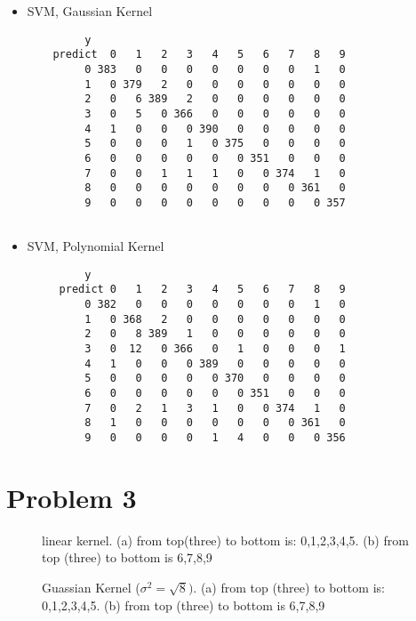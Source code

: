 \documentclass{article}
\begin{document}
\begin{itemize}
	\item SVM, Gaussian Kernel
	\begin{verbatim}
	     y
	predict  0   1   2   3   4   5   6   7   8   9
	     0 383   0   0   0   0   0   0   0   1   0
	     1   0 379   2   0   0   0   0   0   0   0
	     2   0   6 389   2   0   0   0   0   0   0
	     3   0   5   0 366   0   0   0   0   0   0
	     4   1   0   0   0 390   0   0   0   0   0
	     5   0   0   0   1   0 375   0   0   0   0
	     6   0   0   0   0   0   0 351   0   0   0
	     7   0   0   1   1   1   0   0 374   1   0
	     8   0   0   0   0   0   0   0   0 361   0
	     9   0   0   0   0   0   0   0   0   0 357
	     
	\end{verbatim}
	
	\item SVM, Polynomial Kernel
	\begin{verbatim}
	     y
	 predict 0   1   2   3   4   5   6   7   8   9
	     0 382   0   0   0   0   0   0   0   1   0
	     1   0 368   2   0   0   0   0   0   0   0
	     2   0   8 389   1   0   0   0   0   0   0
	     3   0  12   0 366   0   1   0   0   0   1
	     4   1   0   0   0 389   0   0   0   0   0
	     5   0   0   0   0   0 370   0   0   0   0
	     6   0   0   0   0   0   0 351   0   0   0
	     7   0   2   1   3   1   0   0 374   1   0
	     8   1   0   0   0   0   0   0   0 361   0
	     9   0   0   0   0   1   4   0   0   0 356
	\end{verbatim}
	
\end{itemize}

\section{Problem 3}
 \begin{figure}[H]
 	\centering

 	\caption{linear kernel. (a) from top(three) to bottom is: 0,1,2,3,4,5. (b) from top (three) to bottom is 6,7,8,9 }
 	\label{fig:pattern1}
 \end{figure}
  \begin{figure}[H]
 	\centering
 	
 	\caption{Guassian Kernel ($\sigma^2=\sqrt{8})$. (a) from top (three) to bottom is: 0,1,2,3,4,5. (b) from top (three) to bottom is 6,7,8,9 }
 	\label{fig:pattern1}
 \end{figure}
 
\end{document}
